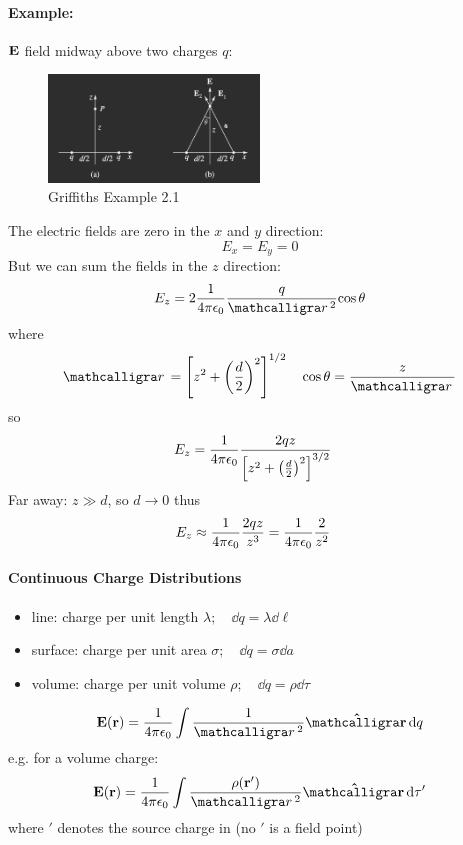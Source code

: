 \documentclass[../main.tex]{subfiles}
\begin{document}
\paragraph*{Example:} $\vb E$ field midway above two charges $q$:
\begin{figure}[ht]
    \centering
    \includegraphics[width=0.5\textwidth]{ex2_1.png}
    \caption{Griffiths Example 2.1}
\end{figure}
The electric fields are zero in the $x$ and $y$ direction:
\[E_x = E_y = 0\]
But we can sum the fields in the $z$ direction:
\[E_z = 2 \ke \frac{q}{\scriptr^2}{\cos\theta}\]
where
\[\scriptr = \qt[z^2 + \qt(\frac{d}{2})^2]^{1/2} \quad \cos\theta = \frac{z}{\scriptr}\]
so
\begin{align*}
    E_z &= \ke \frac{2qz}{\qt[z^2 + \qt(\frac{d}{2})^2]^{3/2}}
\end{align*}
Far away: $z \gg d$, so $d \to 0$ thus
\begin{align*}
    E_z &\approx \frac{1}{4\pi\epsilon_0} \frac{2qz}{z^3} = \frac{1}{4\pi\epsilon_0} \frac{2}{z^2}
\end{align*}

\paragraph*{Continuous Charge Distributions}

\begin{itemize}
    \item line: charge per unit length $\lambda; \quad \dd q = \lambda \dd \ell$
    \item surface: charge per unit area $\sigma; \quad \dd q = \sigma \dd a$
    \item volume: charge per unit volume $\rho; \quad \dd q = \rho \dd \tau$
\end{itemize}
\[\vb E(\vb r) = \ke \int \frac{1}{\scriptr^2} \vu\scriptr \dd q\]
e.g. for a volume charge:
\[\vb E(\vb r) = \ke \int \frac{\rho(\vb r')}{\scriptr^2} \vu\scriptr \dd \tau'\]
where $'$ denotes the source charge in (no $'$ is a field point)
\end{document}
